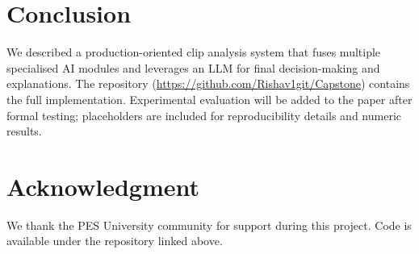 \documentclass[conference]{IEEEtran}
\begin{document}
\section{Conclusion}
We described a production-oriented clip analysis system that fuses multiple specialised AI modules and leverages an LLM for final decision-making and explanations. The repository (\url{https://github.com/Rishav1git/Capstone}) contains the full implementation. Experimental evaluation will be added to the paper after formal testing; placeholders are included for reproducibility details and numeric results.

\section*{Acknowledgment}
We thank the PES University community for support during this project. Code is available under the repository linked above.



\end{document}
